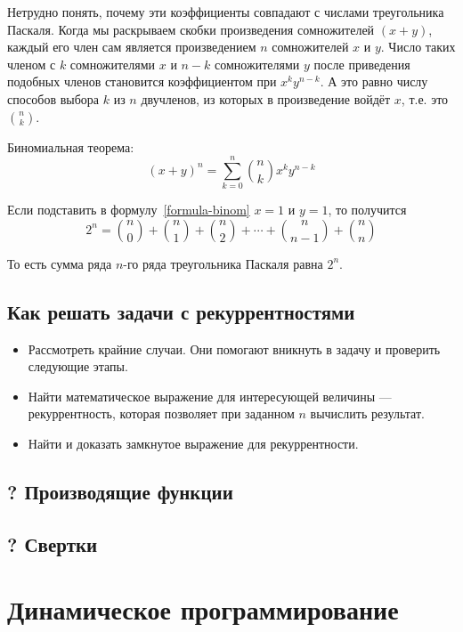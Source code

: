 \documentclass[14pt]{book}
\begin{document}
Нетрудно понять, почему эти коэффициенты совпадают с числами треугольника Паскаля.
Когда мы раскрываем скобки произведения сомножителей $(x+y)$,
каждый его член сам является произведением $n$ сомножителей $x$ и $y$.
Число таких членом с $k$ сомножителями $x$ и $n-k$ сомножителями $y$ после приведения
подобных членов становится коэффициентом при $x^ky^{n-k}$. А это равно числу
способов выбора $k$ из $n$ двучленов, из которых в произведение войдёт $x$,
т.е. это $\binom{n}{k}$.

Биномиальная теорема:
\begin{equation}
\label{formula-binom}
(x+y)^n = \sum_{k=0}^{n}\binom{n}{k}x^ky^{n-k}
\end{equation}

Если подставить в формулу~\ref{formula-binom} $x=1$ и $y=1$, то получится
\begin{equation}
2^n = \binom{n}{0} + \binom{n}{1} + \binom{n}{2} + \cdots + \binom{n}{n-1} + \binom{n}{n}
\end{equation}

То есть сумма ряда $n$-го ряда треугольника Паскаля равна $2^n$.

\section{Как решать задачи с рекуррентностями}

\begin{itemize}
\item Рассмотреть крайние случаи. Они помогают вникнуть в задачу и проверить
      следующие этапы.
\item Найти математическое выражение для интересующей величины ---
      рекуррентность, которая позволяет при заданном $n$ вычислить результат.
\item Найти и доказать замкнутое выражение для рекуррентности.
\end{itemize}



\section{? Производящие функции}
\section{? Свертки}

\chapter{Динамическое программирование}
\end{document}
